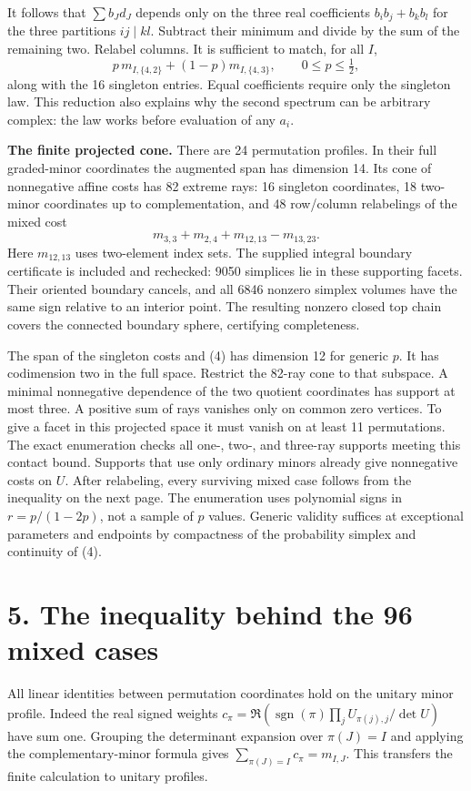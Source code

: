\documentclass[11pt]{article}
\newcommand{\heading}[1]{\section*{\color{ink}#1}}
\begin{document}
\par It follows that $\sum b_Jd_J$ depends only on the three real coefficients $b_i b_j+b_k b_l$ for the three partitions $ij\mid kl$. Subtract their minimum and divide by the sum of the remaining two. Relabel columns. It is sufficient to match, for all $I$,
\[
 p\, m_{I,\{4,2\}}+(1-p)m_{I,\{4,3\}},\qquad 0\le p\le\tfrac12, \tag{4}
\]
along with the 16 singleton entries. Equal coefficients require only the singleton law. This reduction also explains why the second spectrum can be arbitrary complex: the law works before evaluation of any $a_i$.
\par\textbf{The finite projected cone.} There are 24 permutation profiles. In their full graded-minor coordinates the augmented span has dimension 14. Its cone of nonnegative affine costs has 82 extreme rays: 16 singleton coordinates, 18 two-minor coordinates up to complementation, and 48 row/column relabelings of the mixed cost
\[
 m_{3,3}+m_{2,4}+m_{12,13}-m_{13,23}.
\]
Here $m_{12,13}$ uses two-element index sets. The supplied integral boundary certificate is included and rechecked: 9050 simplices lie in these supporting facets. Their oriented boundary cancels, and all 6846 nonzero simplex volumes have the same sign relative to an interior point. The resulting nonzero closed top chain covers the connected boundary sphere, certifying completeness.
\par The span of the singleton costs and (4) has dimension 12 for generic $p$. It has codimension two in the full space. Restrict the 82-ray cone to that subspace. A minimal nonnegative dependence of the two quotient coordinates has support at most three. A positive sum of rays vanishes only on common zero vertices. To give a facet in this projected space it must vanish on at least 11 permutations. The exact enumeration checks all one-, two-, and three-ray supports meeting this contact bound. Supports that use only ordinary minors already give nonnegative costs on $U$. After relabeling, every surviving mixed case follows from the inequality on the next page. The enumeration uses polynomial signs in $r=p/(1-2p)$, not a sample of $p$ values. Generic validity suffices at exceptional parameters and endpoints by compactness of the probability simplex and continuity of (4).
\newpage
\heading{5. The inequality behind the 96 mixed cases}
All linear identities between permutation coordinates hold on the unitary minor profile. Indeed the real signed weights $c_\pi=\Re(\operatorname{sgn}(\pi)\prod_j U_{\pi(j),j}/\det U)$ have sum one. Grouping the determinant expansion over $\pi(J)=I$ and applying the complementary-minor formula gives $\sum_{\pi(J)=I}c_\pi=m_{I,J}$. This transfers the finite calculation to unitary profiles.
\end{document}
